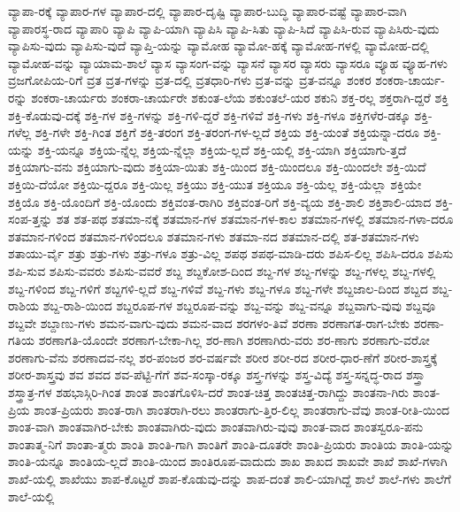 {ವ್ಯಾಪಾ-ರಕ್ಕೆ
ವ್ಯಾಪಾರ-ಗಳ
ವ್ಯಾಪಾರ-ದಲ್ಲಿ
ವ್ಯಾಪಾರ-ದೃಷ್ಟಿ
ವ್ಯಾಪಾರ-ಬುದ್ಧಿ
ವ್ಯಾಪಾರ-ವಷ್ಟೆ
ವ್ಯಾಪಾರ-ವಾಗಿ
ವ್ಯಾಪಾರಸ್ಥ-ರಾದ
ವ್ಯಾಪಾರಿ
ವ್ಯಾಪಿ
ವ್ಯಾಪಿ-ಯಾಗಿ
ವ್ಯಾಪಿಸಿ
ವ್ಯಾಪಿ-ಸಿತು
ವ್ಯಾಪಿ-ಸಿದೆ
ವ್ಯಾಪಿಸಿ-ರುವ
ವ್ಯಾಪಿಸಿರು-ವುದು
ವ್ಯಾಪಿಸು-ವುದು
ವ್ಯಾಪಿಸು-ವುದೆ
ವ್ಯಾಪ್ತಿ-ಯನ್ನು
ವ್ಯಾಮೋಹ
ವ್ಯಾಮೋ-ಹಕ್ಕೆ
ವ್ಯಾಮೋಹ-ಗಳಲ್ಲಿ
ವ್ಯಾಮೋಹ-ದಲ್ಲಿ
ವ್ಯಾಮೋಹ-ವನ್ನು
ವ್ಯಾಯಾಮ-ಶಾಲೆ
ವ್ಯಾಸ
ವ್ಯಾಸಂಗ-ವನ್ನು
ವ್ಯಾಸನೆ
ವ್ಯಾಸರ
ವ್ಯಾಸರು
ವ್ಯಾಸರೂ
ವ್ಯೂಹ
ವ್ಯೂಹ-ಗಳು
ವ್ರಜಗೋಪಿಯ-ರಿಗೆ
ವ್ರತ
ವ್ರತ-ಗಳನ್ನು
ವ್ರತ-ದಲ್ಲಿ
ವ್ರತಧಾರಿ-ಗಳು
ವ್ರತ-ವನ್ನು
ವ್ರತ-ವನ್ನೂ
ಶಂಕರ
ಶಂಕರಾ-ಚಾರ್ಯ-ರನ್ನು
ಶಂಕರಾ-ಚಾರ್ಯರು
ಶಂಕರಾ-ಚಾರ್ಯರೇ
ಶಕುಂತ-ಲೆಯ
ಶಕುಂತಲೆ-ಯರ
ಶಕುನಿ
ಶಕ್ತ-ರಲ್ಲ
ಶಕ್ತರಾಗಿ-ದ್ದರೆ
ಶಕ್ತಿ
ಶಕ್ತಿ-ಕೊಡುವು-ದಕ್ಕೆ
ಶಕ್ತಿ-ಗಳ
ಶಕ್ತಿ-ಗಳನ್ನು
ಶಕ್ತಿ-ಗಳಿ-ದ್ದರೆ
ಶಕ್ತಿ-ಗಳಿವೆ
ಶಕ್ತಿ-ಗಳು
ಶಕ್ತಿ-ಗಳೂ
ಶಕ್ತಿಗಳೆರ-ಡಕ್ಕೂ
ಶಕ್ತಿ-ಗಳೆಲ್ಲ
ಶಕ್ತಿ-ಗಳೇ
ಶಕ್ತಿ-ಗಿಂತ
ಶಕ್ತಿಗೆ
ಶಕ್ತಿ-ತರಂಗ
ಶಕ್ತಿ-ತರಂಗ-ಗಳ-ಲ್ಲದೆ
ಶಕ್ತಿಯ
ಶಕ್ತಿ-ಯಂತೆ
ಶಕ್ತಿಯನ್ನಾ-ದರೂ
ಶಕ್ತಿ-ಯನ್ನು
ಶಕ್ತಿ-ಯನ್ನೂ
ಶಕ್ತಿಯ-ನ್ನೆಲ್ಲ
ಶಕ್ತಿಯ-ನ್ನೆಲ್ಲಾ
ಶಕ್ತಿಯ-ಲ್ಲದೆ
ಶಕ್ತಿ-ಯಲ್ಲಿ
ಶಕ್ತಿ-ಯಾಗಿ
ಶಕ್ತಿಯಾಗು-ತ್ತದೆ
ಶಕ್ತಿಯಾಗು-ವನು
ಶಕ್ತಿಯಾಗು-ವುದು
ಶಕ್ತಿಯಾ-ಯಿತು
ಶಕ್ತಿ-ಯಿಂದ
ಶಕ್ತಿ-ಯಿಂದಲೂ
ಶಕ್ತಿ-ಯಿಂದಲೇ
ಶಕ್ತಿ-ಯಿದೆ
ಶಕ್ತಿಯಿ-ದೆಯೋ
ಶಕ್ತಿಯಿ-ದ್ದರೂ
ಶಕ್ತಿ-ಯಿಲ್ಲ
ಶಕ್ತಿಯು
ಶಕ್ತಿ-ಯುತ
ಶಕ್ತಿಯೂ
ಶಕ್ತಿ-ಯೆಲ್ಲ
ಶಕ್ತಿ-ಯೆಲ್ಲಾ
ಶಕ್ತಿಯೇ
ಶಕ್ತಿಯೊ
ಶಕ್ತಿ-ಯೊಂದಿಗೆ
ಶಕ್ತಿ-ಯೊಂದು
ಶಕ್ತಿವಂತ-ರಾಗಿರಿ
ಶಕ್ತಿವಂತ-ರಿಗೆ
ಶಕ್ತಿ-ವ್ಯಯ
ಶಕ್ತಿ-ಶಾಲಿ
ಶಕ್ತಿಶಾಲಿ-ಯಾದ
ಶಕ್ತಿ-ಸಂಪ-ತ್ತನ್ನು
ಶತ
ಶತ-ಪಥ
ಶತಮಾ-ನಕ್ಕೆ
ಶತಮಾನ-ಗಳ
ಶತಮಾನ-ಗಳ-ಕಾಲ
ಶತಮಾನ-ಗಳಲ್ಲಿ
ಶತಮಾನ-ಗಳಾ-ದರೂ
ಶತಮಾನ-ಗಳಿಂದ
ಶತಮಾನ-ಗಳಿಂದಲೂ
ಶತಮಾನ-ಗಳು
ಶತಮಾ-ನದ
ಶತಮಾನ-ದಲ್ಲಿ
ಶತ-ಶತಮಾನ-ಗಳು
ಶತಾಯು-ರ್ವೈ
ಶತ್ರು
ಶತ್ರು-ಗಳು
ಶತ್ರು-ಗಳೂ
ಶತ್ರು-ವಿಲ್ಲ
ಶಪಥ
ಶಪಥ-ಮಾಡಿ-ದರು
ಶಪಿಸ-ಲಿಲ್ಲ
ಶಪಿಸಿ-ದರೂ
ಶಪಿಸು
ಶಪಿ-ಸುವ
ಶಪಿಸು-ವವರು
ಶಪಿಸು-ವವರೆ
ಶಬ್ದ
ಶಬ್ದಕೋಶ-ದಿಂದ
ಶಬ್ದ-ಗಳ
ಶಬ್ದ-ಗಳನ್ನು
ಶಬ್ದ-ಗಳಲ್ಲ
ಶಬ್ದ-ಗಳಲ್ಲಿ
ಶಬ್ದ-ಗಳಿಂದ
ಶಬ್ದ-ಗಳಿಗೆ
ಶಬ್ದಗಳಿ-ಲ್ಲದೆ
ಶಬ್ದ-ಗಳಿವೆ
ಶಬ್ದ-ಗಳು
ಶಬ್ದ-ಗಳೂ
ಶಬ್ದ-ಗಳೇ
ಶಬ್ದಜಾಲ-ದಿಂದ
ಶಬ್ದದ
ಶಬ್ದ-ರಾಶಿಯ
ಶಬ್ದ-ರಾಶಿ-ಯಿಂದ
ಶಬ್ದರೂಪ-ಗಳ
ಶಬ್ದರೂಪ-ವನ್ನು
ಶಬ್ದ-ವನ್ನು
ಶಬ್ದ-ವನ್ನೂ
ಶಬ್ದವಾಗು-ವುವು
ಶಬ್ದವೂ
ಶಬ್ದವೇ
ಶಬ್ದಾಣು-ಗಳು
ಶಮನ-ವಾಗು-ವುದು
ಶಮನ-ವಾದ
ಶರಗಳಂ-ತಿವೆ
ಶರಣಾ
ಶರಣಾಗತ-ರಾಗ-ಬೇಕು
ಶರಣಾ-ಗತಿಯ
ಶರಣಾಗತಿ-ಯೊಂದೇ
ಶರಣಾಗ-ಬೇಕಾ-ಗಿಲ್ಲ
ಶರ-ಣಾಗಿ
ಶರಣಾಗಿರು-ವರು
ಶರ-ಣಾಗು
ಶರಣಾಗು-ವರೋ
ಶರಣಾಗು-ವೆನು
ಶರಣಾದವ-ನಲ್ಲ
ಶರ-ಪಂಜರ
ಶರ-ವರ್ಷವೇ
ಶರೀರ
ಶರೀ-ರದ
ಶರೀರ-ಧಾರ-ಣೆಗೆ
ಶರೀರ-ಶಾಸ್ತ್ರಕ್ಕೆ
ಶರೀರ-ಶಾಸ್ತ್ರವು
ಶವ
ಶವದ
ಶವ-ಪೆಟ್ಟಿ-ಗೆಗೆ
ಶವ-ಸಂಸ್ಕಾ-ರಕ್ಕೂ
ಶಸ್ತ್ರ-ಗಳನ್ನು
ಶಸ್ತ್ರ-ವಿದ್ಯೆ
ಶಸ್ತ್ರ-ಸನ್ನದ್ಧ-ರಾದ
ಶಸ್ತ್ರಾ
ಶಸ್ತ್ರಾತ್ರ-ಗಳ
ಶಹಭಾಸ್ಗಿರಿ-ಗಿಂತ
ಶಾಂತ
ಶಾಂತಗೊಳಿಸಿ-ದರೆ
ಶಾಂತ-ಚಿತ್ತ
ಶಾಂತಚಿತ್ತ-ರಾಗಿದ್ದು
ಶಾಂತನಾ-ಗಿರು
ಶಾಂತ-ಪ್ರಿಯ
ಶಾಂತ-ಪ್ರಿಯರು
ಶಾಂತ-ರಾಗಿ
ಶಾಂತರಾಗಿ-ರಲು
ಶಾಂತರಾಗು-ತ್ತಿರ-ಲಿಲ್ಲ
ಶಾಂತರಾಗು-ವೆವು
ಶಾಂತ-ರೀತಿ-ಯಿಂದ
ಶಾಂತ-ವಾಗಿ
ಶಾಂತವಾಗಿರ-ಬೇಕು
ಶಾಂತವಾಗಿರು-ವುದು
ಶಾಂತವಾಗಿರು-ವುವು
ಶಾಂತ-ವಾದ
ಶಾಂತಸ್ವರೂ-ಪನು
ಶಾಂತಾತ್ಮ-ನಿಗೆ
ಶಾಂತಾ-ತ್ಮರು
ಶಾಂತಿ
ಶಾಂತಿ-ಗಾಗಿ
ಶಾಂತಿಗೆ
ಶಾಂತಿ-ದೂತರೇ
ಶಾಂತಿ-ಪ್ರಿಯರು
ಶಾಂತಿಯ
ಶಾಂತಿ-ಯನ್ನು
ಶಾಂತಿ-ಯನ್ನೂ
ಶಾಂತಿಯ-ಲ್ಲದೆ
ಶಾಂತಿ-ಯಿಂದ
ಶಾಂತಿರೂಪ-ವಾದುದು
ಶಾಖ
ಶಾಖದ
ಶಾಖವೇ
ಶಾಖೆ
ಶಾಖೆ-ಗಳಾಗಿ
ಶಾಖೆ-ಯಲ್ಲಿ
ಶಾಖೆಯು
ಶಾಪ-ಕೊಟ್ಟರೆ
ಶಾಪ-ಕೊಡುವು-ದನ್ನು
ಶಾಪ-ದಂತೆ
ಶಾಲಿ-ಯಾಗಿದ್ದೆ
ಶಾಲೆ
ಶಾಲೆ-ಗಳು
ಶಾಲೆಗೆ
ಶಾಲೆ-ಯಲ್ಲಿ
}
